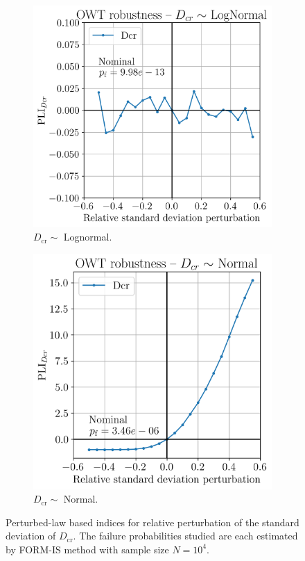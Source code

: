 \begin{figure}
    \centering
    \begin{subfigure}[t]{0.48\linewidth}
        \includegraphics[width=\linewidth]{./part3/figures/OWT/PLI_Dcr_Hyp_LogNormal.png}
        \caption{$D_{\mathrm{cr}} \sim $ Lognormal.}
    \end{subfigure}
    \begin{subfigure}[t]{0.45\linewidth}
        \includegraphics[width=\linewidth]{./part3/figures/OWT/PLI_Dcr_Hyp_Normal.png}
        \caption{$D_{\mathrm{cr}} \sim $ Normal.}
    \end{subfigure}
    \caption{Perturbed-law based indices for relative perturbation of the standard deviation of $D_{\mathrm{cr}}$. 
    The failure probabilities studied are each estimated by FORM-IS method with sample size $N=10^4$.}
    \label{fig:pli_resistance}
\end{figure}

